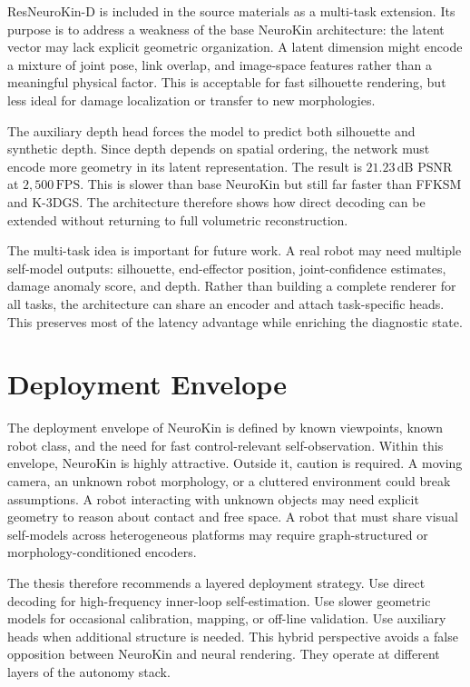\documentclass[12pt,a4paper,oneside]{report}
\begin{document}
ResNeuroKin-D is included in the source materials as a multi-task extension. Its purpose is to address a weakness of the base NeuroKin architecture: the latent vector may lack explicit geometric organization. A latent dimension might encode a mixture of joint pose, link overlap, and image-space features rather than a meaningful physical factor. This is acceptable for fast silhouette rendering, but less ideal for damage localization or transfer to new morphologies.

The auxiliary depth head forces the model to predict both silhouette and synthetic depth. Since depth depends on spatial ordering, the network must encode more geometry in its latent representation. The result is $21.23\,\mathrm{dB}$ PSNR at $2{,}500\,\mathrm{FPS}$. This is slower than base NeuroKin but still far faster than FFKSM and K-3DGS. The architecture therefore shows how direct decoding can be extended without returning to full volumetric reconstruction.

The multi-task idea is important for future work. A real robot may need multiple self-model outputs: silhouette, end-effector position, joint-confidence estimates, damage anomaly score, and depth. Rather than building a complete renderer for all tasks, the architecture can share an encoder and attach task-specific heads. This preserves most of the latency advantage while enriching the diagnostic state.

\section{Deployment Envelope}

The deployment envelope of NeuroKin is defined by known viewpoints, known robot class, and the need for fast control-relevant self-observation. Within this envelope, NeuroKin is highly attractive. Outside it, caution is required. A moving camera, an unknown robot morphology, or a cluttered environment could break assumptions. A robot interacting with unknown objects may need explicit geometry to reason about contact and free space. A robot that must share visual self-models across heterogeneous platforms may require graph-structured or morphology-conditioned encoders.

The thesis therefore recommends a layered deployment strategy. Use direct decoding for high-frequency inner-loop self-estimation. Use slower geometric models for occasional calibration, mapping, or off-line validation. Use auxiliary heads when additional structure is needed. This hybrid perspective avoids a false opposition between NeuroKin and neural rendering. They operate at different layers of the autonomy stack.
\end{document}
